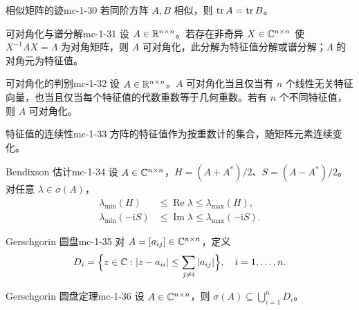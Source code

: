 \begin{corollary}{相似矩阵的迹}{mc-1-30}
若同阶方阵 $A,B$ 相似，则 $\operatorname{tr} A=\operatorname{tr} B$。
\end{corollary}

\begin{definition}{可对角化与谱分解}{mc-1-31}
设 $A\in\mathbb{R}^{n\times n}$。若存在非奇异 $X\in\mathbb{C}^{n\times n}$ 使 $X^{-1}AX=\Lambda$ 为对角矩阵，则 $A$ 可对角化，此分解为特征值分解或谱分解；$\Lambda$ 的对角元为特征值。
\end{definition}

\begin{theorem}{可对角化的判别}{mc-1-32}
设 $A\in\mathbb{R}^{n\times n}$。$A$ 可对角化当且仅当有 $n$ 个线性无关特征向量，也当且仅当每个特征值的代数重数等于几何重数。若有 $n$ 个不同特征值，则 $A$ 可对角化。
\end{theorem}

\begin{theorem}{特征值的连续性}{mc-1-33}
方阵的特征值作为按重数计的集合，随矩阵元素连续变化。
\end{theorem}

\begin{theorem}{Bendixson 估计}{mc-1-34}
设 $A\in\mathbb{C}^{n\times n}$，$H=(A+A^*)/2$、$S=(A-A^*)/2$。对任意 $\lambda\in\sigma(A)$，
\[
\begin{aligned}
\lambda_{\min}(H)&\leq\operatorname{Re}\lambda\leq\lambda_{\max}(H),\\
\lambda_{\min}(-\mathrm i S)&\leq\operatorname{Im}\lambda\leq\lambda_{\max}(-\mathrm i S).
\end{aligned}
\]
\end{theorem}

\begin{definition}{Gerschgorin 圆盘}{mc-1-35}
对 $A=[a_{ij}]\in\mathbb{C}^{n\times n}$，定义
\[D_i=\Bigl\{z\in\mathbb{C}:|z-a_{ii}|\leq\sum_{j\ne i}|a_{ij}|\Bigr\},\quad i=1,\ldots,n.\]
\end{definition}

\begin{theorem}{Gerschgorin 圆盘定理}{mc-1-36}
设 $A\in\mathbb{C}^{n\times n}$，则 $\sigma(A)\subseteq\bigcup_{i=1}^n D_i$。
\end{theorem}

